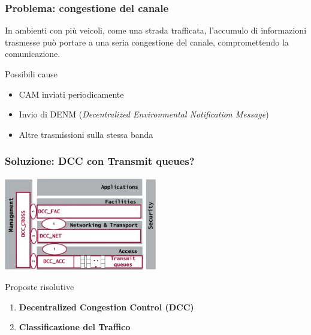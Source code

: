 \documentclass{beamer}
\begin{document}
\begin{frame}
    \frametitle{Problema: congestione del canale}
    In ambienti con più veicoli, come una strada trafficata, l'accumulo di informazioni trasmesse può portare a una \alert{seria congestione del canale}, compromettendo la comunicazione.
    \vfill
    \begin{block}{Possibili cause}
        \begin{itemize}
            \vspace{5pt}
            \item {CAM inviati periodicamente}
            \vspace{5pt}
            \item {Invio di DENM (\textit{Decentralized Environmental Notification Message})}
            \vspace{5pt}
            \item {Altre trasmissioni sulla stessa banda}
            \vspace{5pt}
        \end{itemize}
    \end{block}
    
\end{frame}

\begin{frame}
    \frametitle{Soluzione: DCC con Transmit queues?}
    \centering
    \vfill
    \includegraphics[width=0.5\textwidth]{dcc_edca.jpg}
    \vfill
    \begin{block}{Proposte risolutive}
        \begin{enumerate}
            \vspace{5pt}
            \item \textbf{Decentralized Congestion Control (DCC)}
            \vspace{5pt}
            \item \textbf{Classificazione del Traffico}
            \vspace{5pt}
        \end{enumerate}
    \end{block}
    \vfill
\end{frame}
\end{document}
